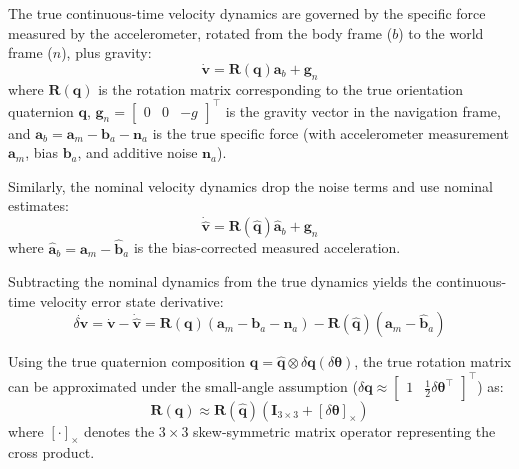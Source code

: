 \documentclass{article}
\begin{document}
	The true continuous-time velocity dynamics are governed by the specific force measured by the accelerometer, rotated from the body frame ($b$) to the world frame ($n$), plus gravity:
	\begin{equation*}
		\dot{\mathbf{v}} = \mathbf{R}(\mathbf{q}) \mathbf{a}_b + \mathbf{g}_n
	\end{equation*}
	where $\mathbf{R}(\mathbf{q})$ is the rotation matrix corresponding to the true orientation quaternion $\mathbf{q}$, $\mathbf{g}_n = \begin{bmatrix} 0 & 0 & -g \end{bmatrix}^\top$ is the gravity vector in the navigation frame, and $\mathbf{a}_b = \mathbf{a}_{m} - \mathbf{b}_a - \mathbf{n}_a$ is the true specific force (with accelerometer measurement $\mathbf{a}_{m}$, bias $\mathbf{b}_a$, and additive noise $\mathbf{n}_a$).
	
	Similarly, the nominal velocity dynamics drop the noise terms and use nominal estimates:
	\begin{equation*}
		\dot{\hat{\mathbf{v}}} = \mathbf{R}(\hat{\mathbf{q}}) \hat{\mathbf{a}}_b + \mathbf{g}_n
	\end{equation*}
	where $\hat{\mathbf{a}}_b = \mathbf{a}_{m} - \hat{\mathbf{b}}_a$ is the bias-corrected measured acceleration.
	
	Subtracting the nominal dynamics from the true dynamics yields the continuous-time velocity error state derivative:
	\begin{equation*}
		\dot{\delta\mathbf{v}} = \dot{\mathbf{v}} - \dot{\hat{\mathbf{v}}} = \mathbf{R}(\mathbf{q}) (\mathbf{a}_{m} - \mathbf{b}_a - \mathbf{n}_a) - \mathbf{R}(\hat{\mathbf{q}}) (\mathbf{a}_{m} - \hat{\mathbf{b}}_a)
	\end{equation*}
	
	Using the true quaternion composition $\mathbf{q} = \hat{\mathbf{q}} \otimes \delta\mathbf{q}(\delta\bm{\theta})$, the true rotation matrix can be approximated under the small-angle assumption ($\delta\mathbf{q} \approx \begin{bmatrix} 1 & \frac{1}{2}\delta\bm{\theta}^\top \end{bmatrix}^\top$) as:
	\begin{equation*}
		\mathbf{R}(\mathbf{q}) \approx \mathbf{R}(\hat{\mathbf{q}}) \left( \mathbf{I}_{3 \times 3} + [\delta\bm{\theta}]_\times \right)
	\end{equation*}
	where $[\cdot]_\times$ denotes the $3 \times 3$ skew-symmetric matrix operator representing the cross product.
	
\end{document}
